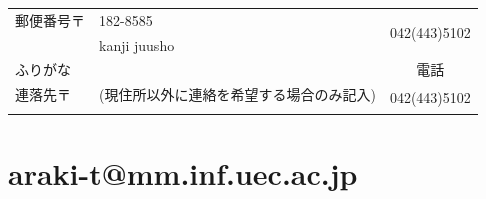 \documentclass[a4j, 11pt]{jarticle}
\begin{document}
\begin{table}[t]
{\begin{tabular}{|l|c|c|c|c|c|}
    郵便番号〒 & \multicolumn{4}{|l|}{182-8585} & \multirow{2}{*}{042(443)5102}\\ 
     & \multicolumn{4}{l|}{kanji juusho} & \\ \hline

   ふりがな & \multicolumn{4}{|l|}{} & 電話 \\ \cline{1-5}
   連落先〒 & \multicolumn{4}{|l|}{(現住所以外に連絡を希望する場合のみ記入)} & \multirow{2}{*}{042(443)5102} \\
   & \multicolumn{4}{|l|}{} & \\
   \hline
  \end{tabular}
}

\end{table}


\section{araki-t@mm.inf.uec.ac.jp}
\end{document}
